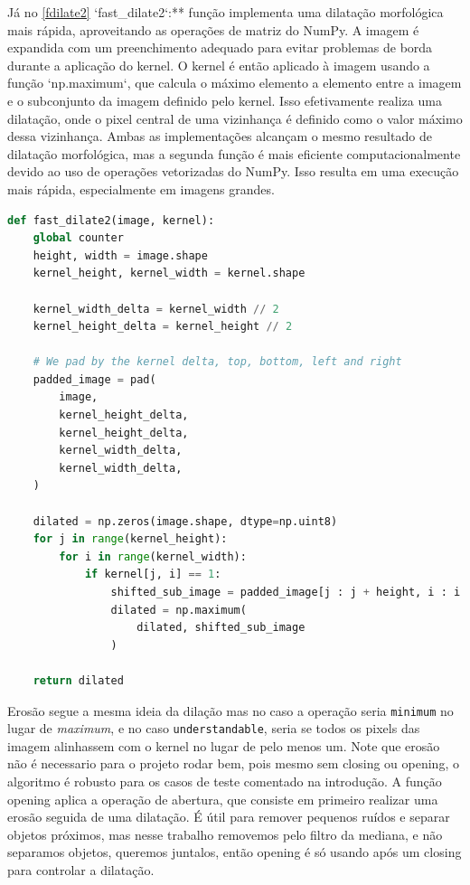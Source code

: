 \documentclass[english, 
               brazil, 
               bsc] %
               {dcomp-abntex2}
\begin{document}
Já no \autoref{fdilate2} `fast\_dilate2`:** função implementa uma dilatação morfológica mais rápida, aproveitando as operações de matriz do NumPy.
A imagem é expandida com um preenchimento adequado para evitar problemas de borda durante a aplicação do kernel.
O kernel é então aplicado à imagem usando a função `np.maximum`, que calcula o máximo elemento a elemento entre a imagem e o subconjunto da imagem definido pelo kernel.
Isso efetivamente realiza uma dilatação, onde o pixel central de uma vizinhança é definido como o valor máximo dessa vizinhança. Ambas as implementações alcançam o mesmo resultado de dilatação morfológica, mas a segunda função é mais eficiente computacionalmente devido ao uso de operações vetorizadas do NumPy. Isso resulta em uma execução mais rápida, especialmente em imagens grandes.

\begin{codigo}[h]
  \caption{\small.}
 \label{fdilate2}
\begin{lstlisting}[language=python]
def fast_dilate2(image, kernel):
    global counter 
    height, width = image.shape
    kernel_height, kernel_width = kernel.shape

    kernel_width_delta = kernel_width // 2
    kernel_height_delta = kernel_height // 2

    # We pad by the kernel delta, top, bottom, left and right
    padded_image = pad(
        image,
        kernel_height_delta,
        kernel_height_delta,
        kernel_width_delta,
        kernel_width_delta,
    )

    dilated = np.zeros(image.shape, dtype=np.uint8)
    for j in range(kernel_height):
        for i in range(kernel_width):
            if kernel[j, i] == 1:
                shifted_sub_image = padded_image[j : j + height, i : i + width]
                dilated = np.maximum(
                    dilated, shifted_sub_image
                )

    return dilated
\end{lstlisting}
\end{codigo}

Erosão segue a mesma ideia da dilação mas no caso a operação seria \texttt{minimum} no lugar de \textit{maximum}, e no caso \texttt{understandable}, seria se todos os pixels das imagem alinhassem com o kernel no lugar de pelo menos um.  Note que erosão não é necessario para o projeto rodar bem, pois mesmo sem closing ou opening, o algoritmo é robusto para os casos de teste comentado na introdução. A função opening aplica a operação de abertura, que consiste em primeiro realizar uma erosão seguida de uma dilatação. É útil para remover pequenos ruídos e separar objetos próximos, mas nesse trabalho removemos pelo filtro da mediana, e não separamos objetos, queremos juntalos, então opening é só usando após um closing para controlar a dilatação.
\end{document}
